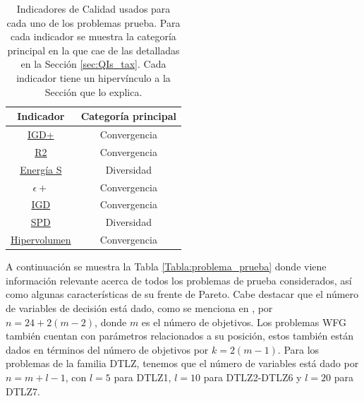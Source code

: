 \begin{table}[H]
    \centering
    \begin{tabular}{|c|c|}
    \textbf{Indicador} & \textbf{Categoría principal} \\ \hline
    \hyperref[sec:IGDp]{IGD+}      & Convergencia                  \\
    \hyperref[sec:R2]{R2}         & Convergencia                  \\
    \hyperref[sec:S-Energy]{Energía S}    & Diversidad                   \\
    \hyperref[sec:Epsilonp]{$\epsilon +$}       & Convergencia                  \\
    \hyperref[sec:IGD]{IGD}       & Convergencia                  \\
    \hyperref[sec:SPD]{SPD}        & Diversidad                   \\
    \hyperref[sec:HV]{Hipervolumen}        & Convergencia                 
    \end{tabular}
    \caption[QI para cada problema]{Indicadores de Calidad usados para cada uno de los problemas prueba. Para cada indicador se muestra la categoría principal en la que cae de las detalladas en la Sección \ref{sec:QIs_tax}. Cada indicador tiene un hipervínculo a la Sección que lo explica.}
    \label{Tabla:QIs}
\end{table}


A continuación se muestra la Tabla \ref{Tabla:problema_prueba} donde viene información relevante acerca de todos los problemas de prueba considerados, así como algunas características de su frente de Pareto. Cabe destacar que el número de variables de decisión está dado, como se menciona en \cite{PFI}, por $n=24+2(m-2)$, donde $m$ es el número de objetivos. Los problemas WFG también cuentan con parámetros relacionados a su posición, estos también están dados en términos del número de objetivos por $k=2(m-1)$. Para los problemas de la familia DTLZ, tenemos que el número de variables está dado por $n=m+l-1$, con $l=5$ para DTLZ1, $l=10$ para DTLZ2-DTLZ6 y $l=20$ para DTLZ7.

